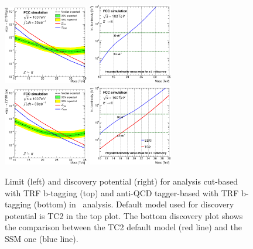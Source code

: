 \begin{figure}[!htb]\centering
\includegraphics[width=0.33\textwidth]{Fig/Zptt/lim_Zprime_tt_fcc_v02_cut_TRFbtag.eps}
\includegraphics[width=0.33\textwidth]{Fig/Zptt/DiscoveryPotential_tt_cut_TRFbtag_rootStyle.eps}
\includegraphics[width=0.33\textwidth]{Fig/Zptt/lim_Zprime_tt_fcc_v02_tagger_TRFbtag.eps}
\includegraphics[width=0.33\textwidth]{Fig/Zptt/DiscoveryPotential_tt_SSM_TC2_tagger_TRFbtag_rootStyle.eps}
\caption{Limit (left) and discovery potential (right) for analysis cut-based with TRF b-tagging (top) and anti-QCD tagger-based with TRF b-tagging (bottom) in \Zptt\ analysis. Default model used for discovery potential is TC2 in the top plot. The bottom discovery plot shows the comparison between the TC2 default model (red line) and the SSM one (blue line).}
\label{fig:Zptt_limit_trf}
\end{figure}

